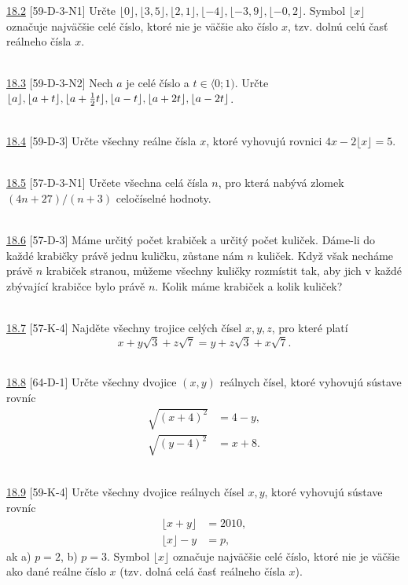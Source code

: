 \noindent \ul{18.2} [59-D-3-N1] Určte $\lfloor 0 \rfloor, \lfloor 3{,}5 \rfloor,\lfloor 2{,}1\rfloor, \lfloor -4 \rfloor, \lfloor -3{,}9 \rfloor, \lfloor -0{,}2\rfloor$. Symbol $\lfloor x\rfloor$ označuje najväčšie celé číslo, ktoré nie je väčšie ako číslo $x$, tzv. dolnú celú časť reálneho čísla $x$.


\\

\noindent \ul{18.3} [59-D-3-N2] Nech $a$ je celé číslo a $t \in \langle 0; 1)$. Určte $\lfloor a \rfloor, \lfloor a+t \rfloor,\lfloor a+\frac{1}{2}t\rfloor, \lfloor a-t \rfloor, \\ \lfloor a+2t \rfloor, \lfloor a-2t\rfloor$.


\\

\noindent \ul{18.4} [59-D-3]
Určte všechny reálne čísla $x$, ktoré vyhovujú rovnici $4x - 2\lfloor x\rfloor = 5$.


\\

\noindent \ul{18.5} [57-D-3-N1] Určete všechna celá čísla $n$, pro která nabývá zlomek $(4n + 27)/(n + 3)$ celočíselné
hodnoty.


\\

\noindent \ul{18.6} [57-D-3] Máme určitý počet krabiček a určitý počet kuliček. Dáme-li do každé
krabičky právě jednu kuličku, zůstane nám $n$ kuliček. Když však necháme právě $n$ krabiček stranou,
můžeme všechny kuličky rozmístit tak, aby jich v každé zbývající krabičce bylo právě $n$. Kolik máme
krabiček a kolik kuliček?


\\

\noindent \ul{18.7} [57-K-4]
Najděte všechny trojice celých čísel $x, y, z$, pro které platí
$$x+y\sqrt{3}+z\sqrt{7}=y+z\sqrt{3}+x\sqrt{7}. $$

\\

\noindent \ul{18.8} [64-D-1]
Určte všechny dvojice $(x, y)$ reálnych čísel, ktoré vyhovujú sústave rovníc
\begin{align*}
\sqrt{(x + 4)^2} &= 4 - y,\\
\sqrt{(y - 4)^2} &= x + 8.
\end{align*}


\\

\noindent \ul{18.9} [59-K-4] Určte všechny dvojice reálnych čísel $x, y$, ktoré vyhovujú sústave rovníc
\begin{align*}
\lfloor x + y\rfloor &= 2 010,\\
\lfloor x\rfloor - y &= p,
\end{align*}
ak a) $p = 2$, b) $p = 3$.
Symbol $\lfloor x \rfloor$ označuje najväčšie celé číslo, ktoré nie je väčšie ako dané reálne číslo $x$ (tzv. dolná celá časť reálneho čísla $x$).


